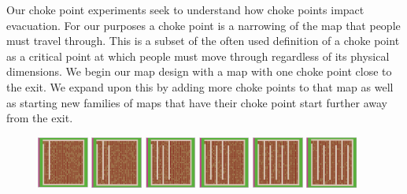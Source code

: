 \documentclass[12pt,letterpaper]{article}
\begin{document}
Our choke point experiments seek to understand how choke points impact evacuation.  For our purposes a choke point is a narrowing of the map that people must travel through.  This is a subset of the often used definition of a choke point as a critical point at which people must move through\cite{evacOptions} regardless of its physical dimensions.  We begin our map design with a map with one choke point close to the exit.  We expand upon this by adding more choke points to that map as well as starting new families of maps that have their choke point start further away from the exit.

\begin{figure}[!ht]
  \centering
  \begin{minipage}[b]{\linewidth}
    \includegraphics[width=0.15\textwidth]{./figures/chokepoint_1_a.png}
    \includegraphics[width=0.15\textwidth]{./figures/chokepoint_1_b.png}
    \includegraphics[width=0.15\textwidth]{./figures/chokepoint_1_c.png}
    \includegraphics[width=0.15\textwidth]{./figures/chokepoint_1_d.png}
    \includegraphics[width=0.15\textwidth]{./figures/chokepoint_1_e.png}
    \includegraphics[width=0.15\textwidth]{./figures/chokepoint_1_f.png}

\end{minipage}
\end{figure}
\end{document}
